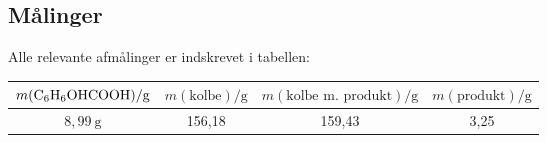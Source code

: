 \subsection*{Målinger}
Alle relevante afmålinger er indskrevet i tabellen:

\begin{table}[h]
    \centering
    \begin{tabular}{|c|c|c|c|}
    \hline
    $m(\ce{C6H6OHCOOH})/\unit{\gram}$
    & $m(\text{kolbe})/\unit{\gram}$ 
    & $m(\text{kolbe m.~produkt})/\unit{\gram}$ & $m(\text{produkt})/\unit{\gram}$ \\ \hline
    $8{,}99\ \unit{\gram}$ & 156{,}18 & 159{,}43 & 3{,}25 \\ \hline
    \end{tabular}
\end{table}